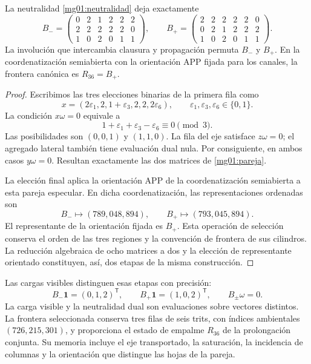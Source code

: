 \begin{proposition}
\label{mg01:dos-orientacion}
La neutralidad \eqref{mg01:neutralidad} deja exactamente
\begin{equation}
 B_-=
 \begin{pmatrix}0&2&1&2&2&2\\2&2&2&2&2&0\\1&0&2&0&1&1\end{pmatrix},
 \qquad
 B_+=
 \begin{pmatrix}2&2&2&2&2&0\\0&2&1&2&2&2\\1&0&2&0&1&1\end{pmatrix}.
 \label{mg01:pareja}
\end{equation}
La involución que intercambia clausura y propagación permuta \(B_-\)
y \(B_+\). En la coordenatización semiabierta con la orientación APP fijada para
los canales, la frontera canónica es \(R_{36}=B_+\).
\end{proposition}
\begin{proof}
Escribimos las tres elecciones binarias de la primera fila como
\[
 x=(2\varepsilon_1,2,1+\varepsilon_3,2,2,2\varepsilon_6),
 \qquad \varepsilon_1,\varepsilon_3,\varepsilon_6\in\{0,1\}.
\]
La condición \(x\omega=0\) equivale a
\[
 1+\varepsilon_1+\varepsilon_3-\varepsilon_6\equiv0\pmod3.
\]
Las posibilidades son \((0,0,1)\) y \((1,1,0)\). La fila del eje
satisface \(z\omega=0\); el agregado lateral también tiene evaluación
dual nula. Por consiguiente, en ambos casos \(y\omega=0\). Resultan
exactamente las dos matrices de \eqref{mg01:pareja}.

La elección final aplica la orientación APP de la coordenatización semiabierta a
esta pareja especular. En dicha coordenatización, las representaciones ordenadas son
\[
 B_-\longmapsto(789,048,894),\qquad
 B_+\longmapsto(793,045,894).
\]
El representante de la orientación fijada es \(B_+\). Esta operación
de selección conserva el orden de las tres regiones y la convención de
frontera de sus cilindros. La reducción algebraica de ocho matrices a
dos y la elección de representante orientado constituyen, así, dos
etapas de la misma construcción.
\end{proof}

Las cargas visibles distinguen esas etapas con precisión:
\begin{equation}
 B_-\mathbf1=(0,1,2)^{\mathsf T},\qquad
 B_+\mathbf1=(1,0,2)^{\mathsf T},\qquad
 B_\pm\omega=0.
 \label{mg01:cargas}
\end{equation}
La carga visible y la neutralidad dual son evaluaciones sobre vectores
distintos. La frontera seleccionada conserva tres filas de seis trits,
con índices ambientales \((726,215,301)\), y proporciona el estado
de empalme \(R_{36}\) de la prolongación conjunta. Su memoria incluye
el eje transportado, la saturación, la incidencia de columnas y la
orientación que distingue las hojas de la pareja.
